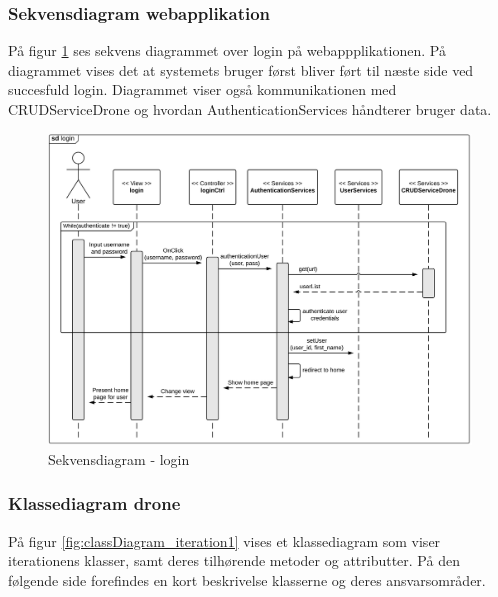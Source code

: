 \newpage

\subsubsection*{Sekvensdiagram webapplikation}
På figur \ref{fig:Sekvens_diagram_login} ses sekvens diagrammet over login på webappplikationen. På diagrammet vises det at systemets bruger først bliver ført til næste side ved succesfuld login. Diagrammet viser også kommunikationen med CRUDServiceDrone og hvordan AuthenticationServices håndterer bruger data.

\begin{figure}[H]
	\centering
	\includegraphics[width=1\textwidth]{Billeder/sekvens/login_sq_diagram.png}
	\caption{Sekvensdiagram - login}
	\label{fig:Sekvens_diagram_login}
\end{figure}
\newpage


\subsubsection*{Klassediagram drone}
\vspace{-0.2cm}
På figur \ref{fig:classDiagram_iteration1} vises et klassediagram som viser iterationens klasser, samt deres tilhørende metoder og attributter. På den følgende side forefindes en kort beskrivelse klasserne og deres ansvarsområder.

